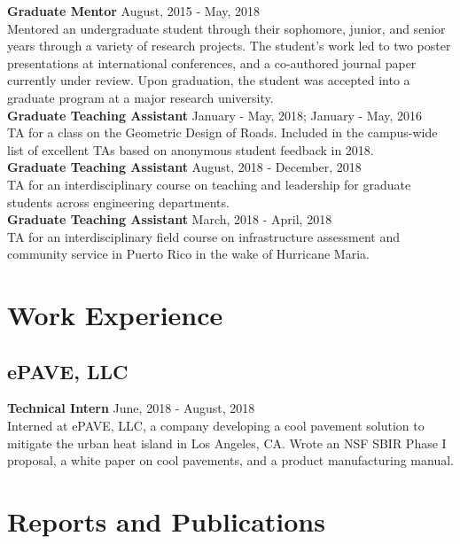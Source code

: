 \documentclass[12pt]{article}
\begin{document}
\textbf{Graduate Mentor} \hfill August, 2015 - May, 2018 \\
Mentored an undergraduate student through their sophomore, junior, and senior years through a variety of research projects. The student's work led to two poster presentations at international conferences, and a co-authored journal paper currently under review. Upon graduation, the student was accepted into a graduate program at a major research university. \\

\textbf{Graduate Teaching Assistant} \hfill January - May, 2018; January - May, 2016 \\
TA for a class on the Geometric Design of Roads. Included in the campus-wide list of excellent TAs based on anonymous student feedback in 2018. \\

\textbf{Graduate Teaching Assistant} \hfill August, 2018 - December, 2018 \\
TA for an interdisciplinary course on teaching and leadership for graduate students across engineering departments. \\

\textbf{Graduate Teaching Assistant} \hfill March, 2018 - April, 2018 \\
TA for an interdisciplinary field course on infrastructure assessment and community service in Puerto Rico in the wake of Hurricane Maria. \\

\section*{Work Experience}
\subsection*{ePAVE, LLC}
\textbf{Technical Intern} \hfill June, 2018 - August, 2018 \\
Interned at ePAVE, LLC, a company developing a cool pavement solution to mitigate the urban heat island in Los Angeles, CA. Wrote an NSF SBIR Phase I proposal, a white paper on cool pavements, and a product manufacturing manual. \\


\section*{Reports and Publications}
\end{document}
